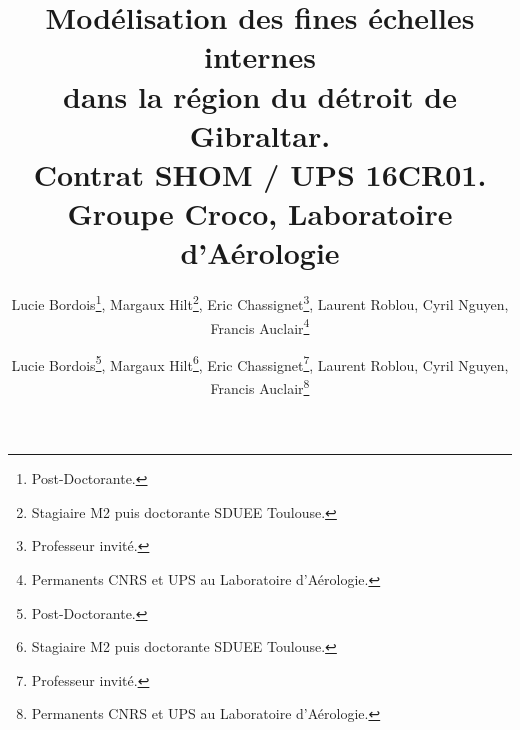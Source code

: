 \documentclass[a4paper,11pt]{report}
\title{
Modélisation des fines échelles internes\\ dans la région du détroit de Gibraltar.\\
\bigskip\bigskip
\large{Contrat SHOM / UPS 16CR01.}\\
\bigskip\bigskip\bigskip\bigskip\bigskip\bigskip
Groupe Croco, Laboratoire d'Aérologie}
\author{Lucie Bordois\footnote{Post-Doctorante.}, Margaux Hilt\footnote{Stagiaire M2 puis doctorante SDUEE 
Toulouse.},
Eric Chassignet\footnote{Professeur invité.},
Laurent Roblou, Cyril Nguyen, Francis Auclair\footnote{Permanents CNRS et UPS au Laboratoire d'Aérologie.}
}
\makeatletter
\renewcommand\@biblabel[1]{}
\makeatother
\begin{document}
 

\renewcommand{\thepage}{}
\renewcommand{\thechapter}{\Roman{chapter}}
\renewcommand{\thesection}{\arabic{section}}
\setcounter{secnumdepth}{4}
\newcommand*{\newpar}{%
  \ifsubsection\else\stepcounter{subsection}\fi
  \paragraph{}}
\setcounter{figure}{0}
\renewcommand{\thefigure}{\Roman{chapter}.\arabic{section}.\arabic{figure}}
\setcounter{table}{0}
\renewcommand{\thetable}{\Roman{chapter}.\arabic{section}.\arabic{table}}

\author{Lucie Bordois\footnote{Post-Doctorante.}, Margaux Hilt\footnote{Stagiaire M2 puis doctorante SDUEE Toulouse.},
Eric Chassignet\footnote{Professeur invité.},
Laurent Roblou, Cyril Nguyen, Francis Auclair\footnote{Permanents CNRS et UPS au Laboratoire d'Aérologie.}
}

\makeatletter %
\renewcommand\@biblabel[1]{}
\makeatother

\renewcommand{\thepage}{}
\renewcommand{\thechapter}{\Roman{chapter}}
\renewcommand{\thesection}{\arabic{section}}
\setcounter{secnumdepth}{4}
\newcommand*{\newpar}{%
  \ifsubsection\else\stepcounter{subsection}\fi
  \paragraph{}}
\setcounter{figure}{0}
\renewcommand{\thefigure}{\Roman{chapter}.\arabic{section}.\arabic{figure}}
\setcounter{table}{0}
\renewcommand{\thetable}{\Roman{chapter}.\arabic{section}.\arabic{table}}
\end{document}
